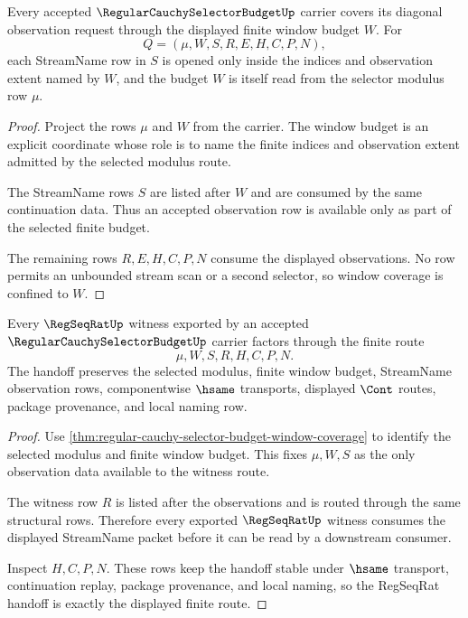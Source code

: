 \begin{theorem}
\label{thm:regular-cauchy-selector-budget-window-coverage}
Every accepted $\RegularCauchySelectorBudgetUp$ carrier covers its diagonal observation request through the displayed finite window budget $W$. For
$$
Q=(\mu,W,S,R,E,H,C,P,N),
$$
each StreamName row in $S$ is opened only inside the indices and observation extent named by $W$, and the budget $W$ is itself read from the selector modulus row $\mu$.
\end{theorem}
\begin{proof}
Project the rows $\mu$ and $W$ from the carrier. The window budget is an explicit coordinate whose role is to name the finite indices and observation extent admitted by the selected modulus route.

The StreamName rows $S$ are listed after $W$ and are consumed by the same continuation data. Thus an accepted observation row is available only as part of the selected finite budget.

The remaining rows $R,E,H,C,P,N$ consume the displayed observations. No row permits an unbounded stream scan or a second selector, so window coverage is confined to $W$.
\end{proof}

\begin{theorem}
\label{thm:regular-cauchy-selector-budget-regseqrat-handoff}
Every $\RegSeqRatUp$ witness exported by an accepted $\RegularCauchySelectorBudgetUp$ carrier factors through the finite route
$$
\mu,W,S,R,H,C,P,N.
$$
The handoff preserves the selected modulus, finite window budget, StreamName observation rows, componentwise $\hsame$ transports, displayed $\Cont$ routes, package provenance, and local naming row.
\end{theorem}
\begin{proof}
Use \autoref{thm:regular-cauchy-selector-budget-window-coverage} to identify the selected modulus and finite window budget. This fixes $\mu,W,S$ as the only observation data available to the witness route.

The witness row $R$ is listed after the observations and is routed through the same structural rows. Therefore every exported $\RegSeqRatUp$ witness consumes the displayed StreamName packet before it can be read by a downstream consumer.

Inspect $H,C,P,N$. These rows keep the handoff stable under $\hsame$ transport, continuation replay, package provenance, and local naming, so the RegSeqRat handoff is exactly the displayed finite route.
\end{proof}

